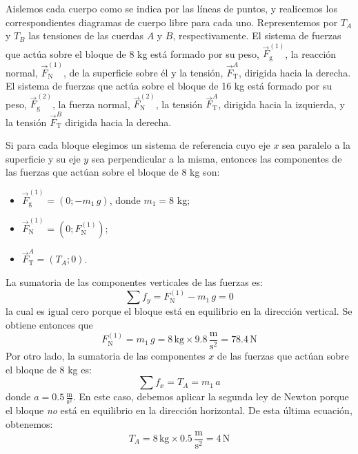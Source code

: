 \documentclass[addpoints]{exam}
\begin{document}
\begin{questions}
    \begin{solution}
        Aislemos cada cuerpo como se indica por las líneas de puntos, y realicemos los correspondientes diagramas de cuerpo libre para cada uno. Representemos por $T_A$ y $T_B$ las tensiones de las cuerdas $A$ y $B$, respectivamente. El sistema de fuerzas que actúa sobre el bloque de 8 kg está formado por su peso, $\vec{F}_\text{g}^{(1)}$, la reacción normal, $\vec{F}_{\text{N}}^{(1)}$, de la superficie sobre él y la tensión, $\vec{F}_\text{T}^A$, dirigida hacia la derecha. El sistema de fuerzas que actúa sobre el bloque de 16 kg está formado por su peso, $\vec{F}_\text{g}^{(2)}$, la fuerza normal, $\vec{F}_{\text{N}}^{(2)}$, la tensión $\vec{F}_\text{T}^A$, dirigida hacia la izquierda, y la tensión $\vec{F}_\text{T}^B$ dirigida hacia la derecha. 
        
        Si para cada bloque elegimos un sistema de referencia cuyo eje $x$ sea paralelo a la superficie y su eje $y$ sea perpendicular a la misma, entonces las componentes de las fuerzas que actúan sobre el bloque de 8 kg son:
        \begin{itemize}
            \item $\vec{F}_\text{g}^{(1)} = \left(0; - m_1 \, g\right)$, donde $m_1 = 8$ kg;
            \item $\vec{F}_{\text{N}}^{(1)} = \left(0;F_{\text{N}}^{(1)}\right)$;
            \item $\vec{F}_\text{T}^A = \left(T_A; 0\right)$.
        \end{itemize}
        La sumatoria de las componentes verticales de las fuerzas es: $$\sum f_y = F_{\text{N}}^{(1)} - m_1 \, g = 0$$ la cual es igual cero porque el bloque está en equilibrio en la dirección vertical. Se obtiene entonces que $$ F_{\text{N}}^{(1)} = m_1 \, g = 8 \, \text{kg} \times 9.8 \, \frac{\text{m}}{\text{s}^2} = 78.4 \, \text{N}$$ Por otro lado, la sumatoria de las componentes $x$ de las fuerzas que actúan sobre el bloque de 8 kg es: $$\sum f_x = T_A = m_1 \, a$$ donde $a = 0.5 \, \frac{\text{m}}{\text{s}^2}$. En este caso, debemos aplicar la segunda ley de Newton porque el bloque \emph{no} está en equilibrio en la dirección horizontal. De esta última ecuación, obtenemos: $$T_A = 8 \, \text{kg} \times 0.5 \, \frac{\text{m}}{\text{s}^2} = 4 \, \text{N}$$


\end{solution}
\end{questions}
\end{document}
